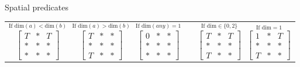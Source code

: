 \documentclass[11pt,ignorenonframetext,]{beamer}
\begin{document}
\begin{frame}{Spatial predicates}
{\begin{tabular}{lll}
$\overset{\text{If dim}(a) < \text{dim}(b)}{\begin{bmatrix} T & * & T \\ * & * & * \\ * & * & * \end{bmatrix}} ~~~
\overset{\text{If dim}(a) > \text{dim}(b)}{\begin{bmatrix} T & * & * \\ * & * & * \\ T & * & * \end{bmatrix}} ~~~
\overset{\text{If dim}(any) = 1}{\begin{bmatrix} 0 & * & * \\ * & * & * \\ * & * & * \end{bmatrix}}$ & &
$\overset{\text{If dim} \in \{0,2\}}{\begin{bmatrix} T & * & T \\ * & * & * \\ T & * & * \end{bmatrix}} ~~~
\overset{\text{If dim} = 1}{\begin{bmatrix} 1 & * & T \\ * & * & * \\ T & * & * \end{bmatrix}}$ \\
\end{tabular}
}

\end{frame}
\end{document}
